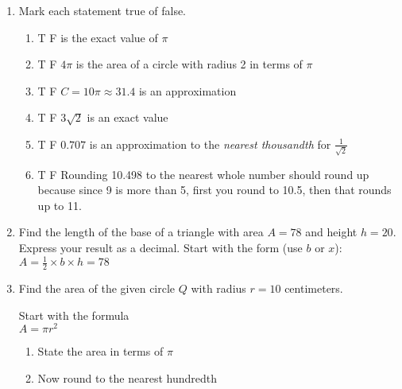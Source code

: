 \begin{enumerate}
\item Mark each statement true of false.
\begin{enumerate}[itemsep=0.3cm]
  \item T \quad F  is the exact value of $\pi$
  \item T \quad F \qquad $4\pi$ is the area of a circle with radius 2 in terms of $\pi$
  \item T \quad F \qquad $C = 10\pi \approx 31.4$ is an approximation
  \item T \quad F \qquad $3\sqrt{2}$ is an exact value
  \item T \quad F \qquad $0.707$ is an approximation to the \emph{nearest thousandth} for $\displaystyle \frac{1}{\sqrt{2}}$
  \item T \quad F \qquad Rounding 10.498 to the nearest whole number should round up because since 9 is more than 5, first you round to 10.5, then that rounds up to 11.
\end{enumerate}



\item Find the length of the base of a triangle with area $A=78$ and height $h=20$. Express your result as a decimal. Start with the form (use $b$ or $x$): \\[0.5cm]
$A = \frac{1}{2} \times b \times h = 78$
  \begin{flushright}
  \end{flushright}

\item Find the area of the given circle $Q$ with radius $r=10$ centimeters.
  \begin{multicols}{2}
  \raggedcolumns
  Start with the formula\\[0.5cm]
  $A = \pi r^2$ 
  \begin{enumerate}
    \item State the area in terms of $\pi$ \vspace{1.7cm}
    \item Now round to the nearest hundredth
  \end{enumerate}
  \end{multicols}


\end{enumerate}
